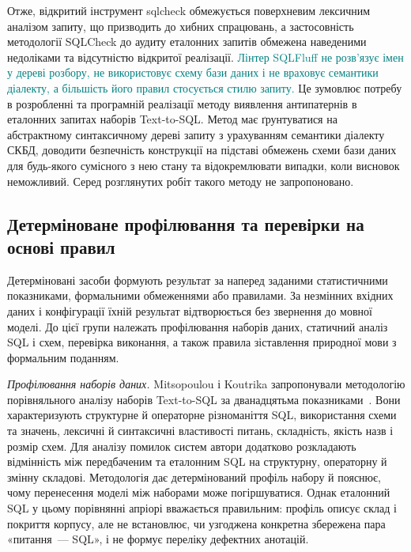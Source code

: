 \documentclass[a4paper,14pt,oneside]{extreport}
\begin{document}
Отже, відкритий інструмент sqlcheck обмежується поверхневим лексичним аналізом запиту, що призводить до хибних спрацювань, а застосовність методології SQLCheck до аудиту еталонних запитів обмежена наведеними недоліками та відсутністю відкритої реалізації. \textcolor{teal}{Лінтер SQLFluff не розв'язує імен у дереві розбору, не використовує схему бази даних і не враховує семантики діалекту, а більшість його правил стосується стилю запиту.} Це зумовлює потребу в розробленні та програмній реалізації методу виявлення антипатернів в еталонних запитах наборів Text-to-SQL. Метод має ґрунтуватися на абстрактному синтаксичному дереві запиту з урахуванням семантики діалекту СКБД, доводити безпечність конструкції на підставі обмежень схеми бази даних для будь-якого сумісного з нею стану та відокремлювати випадки, коли висновок неможливий. Серед розглянутих робіт такого методу не запропоновано.

\subsection{Детерміноване профілювання та перевірки на основі правил}
\label{subsec:rule-based-audit}

Детерміновані засоби формують результат за наперед заданими статистичними показниками, формальними обмеженнями або правилами. За незмінних вхідних даних і конфігурації їхній результат відтворюється без звернення до мовної моделі. До цієї групи належать профілювання наборів даних, статичний аналіз SQL і схем, перевірка виконання, а також правила зіставлення природної мови з формальним поданням.

\textit{Профілювання наборів даних.}
Mitsopoulou і Koutrika запропонували методологію порівняльного аналізу наборів Text-to-SQL за дванадцятьма показниками~\cite{mitsopoulou2025analysis}. Вони характеризують структурне й операторне різноманіття SQL, використання схеми та значень, лексичні й синтаксичні властивості питань, складність, якість назв і розмір схем. Для аналізу помилок систем автори додатково розкладають відмінність між передбаченим та еталонним SQL на структурну, операторну й змінну складові. Методологія дає детермінований профіль набору й пояснює, чому перенесення моделі між наборами може погіршуватися. Однак еталонний SQL у цьому порівнянні апріорі вважається правильним: профіль описує склад і покриття корпусу, але не встановлює, чи узгоджена конкретна збережена пара «питання~--- SQL», і не формує переліку дефектних анотацій.
\end{document}
